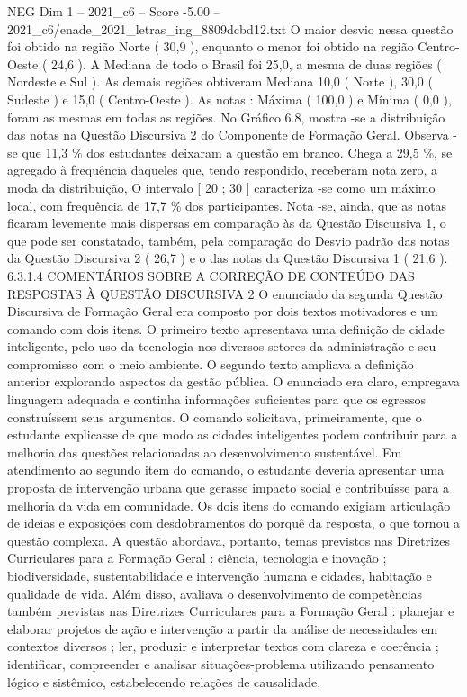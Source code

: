 \begin{textsample}{NEG Dim 1 – 2021\_c6 – Score -5.00 – 2021\_c6/enade\_2021\_letras\_ing\_8809dcbd12.txt}
O maior desvio nessa questão foi obtido na região Norte ( 30,9 ), enquanto o menor foi obtido na região Centro-Oeste ( 24,6 ).
A Mediana de todo o Brasil foi 25,0, a mesma de duas regiões ( Nordeste e Sul ).
As demais regiões obtiveram Mediana 10,0 ( Norte ), 30,0 ( Sudeste ) e 15,0 ( Centro-Oeste ).
As notas : Máxima ( 100,0 ) e Mínima ( 0,0 ), foram as mesmas em todas as regiões.
No Gráfico 6.8, mostra -se a distribuição das notas na Questão Discursiva 2 do Componente de Formação Geral.
Observa -se que 11,3 \% dos estudantes deixaram a questão em branco.
Chega a 29,5 \%, se agregado à frequência daqueles que, tendo respondido, receberam nota zero, a moda da distribuição, O intervalo [ 20 ; 30 ] caracteriza -se como um máximo local, com frequência de 17,7 \% dos participantes.
Nota -se, ainda, que as notas ficaram levemente mais dispersas em comparação às da Questão Discursiva 1, o que pode ser constatado, também, pela comparação do Desvio padrão das notas da Questão Discursiva 2 ( 26,7 ) e o das notas da Questão Discursiva 1 ( 21,6 ). 6.3.1.4 COMENTÁRIOS SOBRE A CORREÇÃO DE CONTEÚDO DAS RESPOSTAS À QUESTÃO DISCURSIVA 2 O enunciado da segunda Questão Discursiva de Formação Geral era composto por dois textos motivadores e um comando com dois itens.
O primeiro texto apresentava uma definição de cidade inteligente, pelo uso da tecnologia nos diversos setores da administração e seu compromisso com o meio ambiente.
O segundo texto ampliava a definição anterior explorando aspectos da gestão pública.
O enunciado era claro, empregava linguagem adequada e continha informações suficientes para que os egressos construíssem seus argumentos.
O comando solicitava, primeiramente, que o estudante explicasse de que modo as cidades inteligentes podem contribuir para a melhoria das questões relacionadas ao desenvolvimento sustentável.
Em atendimento ao segundo item do comando, o estudante deveria apresentar uma proposta de intervenção urbana que gerasse impacto social e contribuísse para a melhoria da vida em comunidade.
Os dois itens do comando exigiam articulação de ideias e exposições com desdobramentos do porquê da resposta, o que tornou a questão complexa.
A questão abordava, portanto, temas previstos nas Diretrizes Curriculares para a Formação Geral : ciência, tecnologia e inovação ; biodiversidade, sustentabilidade e intervenção humana e cidades, habitação e qualidade de vida.
Além disso, avaliava o desenvolvimento de competências também previstas nas Diretrizes Curriculares para a Formação Geral : planejar e elaborar projetos de ação e intervenção a partir da análise de necessidades em contextos diversos ; ler, produzir e interpretar textos com clareza e coerência ; identificar, compreender e analisar situações-problema utilizando pensamento lógico e sistêmico, estabelecendo relações de causalidade.

\end{textsample}
